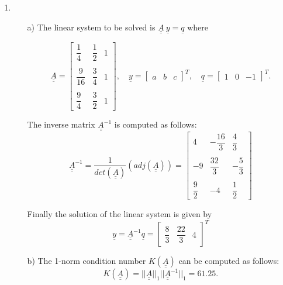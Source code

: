 \documentclass{article}
\begin{document}
\begin{enumerate}
\item
\begin{itemize}
\item[a)] The linear system to be solved is $\underline{\underline{A}}~\underline{y} = \underline{q}$ where 

\begin{equation*}
\underline{\underline{A}} = 
\begin{bmatrix}
\dfrac{1}{4} & \dfrac{1}{2} & 1\\\\
\dfrac{9}{16} & \dfrac{3}{4} & 1\\\\
\dfrac{9}{4} & \dfrac{3}{2} & 1%
\end{bmatrix}, \quad
\underline{y} = 
\begin{bmatrix}
a & b & c
\end{bmatrix}^T, \quad
\underline{q} = 
\begin{bmatrix}
1 & 0 & -1
\end{bmatrix}^T.
\end{equation*}

The inverse matrix $\underline{\underline{A}}^{-1}$ is computed as follows:
\begin{equation*}
\underline{\underline{A}}^{-1} = 
\dfrac{1}{det(\underline{\underline{A}})} (adj(\underline{\underline{A}})) = 
\begin{bmatrix}
4 & -\dfrac{16}{3} & \dfrac{4}{3}\\\\
-9 & \dfrac{32}{3} & -\dfrac{5}{3}\\\\
\dfrac{9}{2} & -4 & \dfrac{1}{2}%
\end{bmatrix}
\end{equation*}

Finally the solution of the linear system is given by 
\begin{equation*}
\underline{y} = \underline{\underline{A}}^{-1} \underline{q} = 
\begin{bmatrix}
\dfrac{8}{3} & \dfrac{22}{3} & 4
\end{bmatrix}^T
\end{equation*}

\item[b)] The 1-norm condition number $K(\underline{\underline{A}})$ can be computed as follows:
\begin{equation*}
K(\underline{\underline{A}}) = ||\underline{\underline{A}}||_1 ||\underline{\underline{A}}^{-1}||_1 = 61.25.  
\end{equation*}


\end{itemize}
\end{enumerate}
\end{document}
